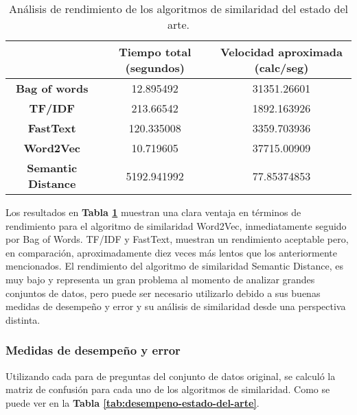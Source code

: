\begin{table}[]
	\centering
	\begin{tabular}{|c|c|c|}
		\hline
		& \textbf{Tiempo total (segundos)} & \textbf{Velocidad aproximada (calc/seg)} \\ \hline
		\textbf{Bag of words} & 12.895492 & 31351.26601 \\ \hline
		\textbf{TF/IDF} & 213.66542 & 1892.163926 \\ \hline
		\textbf{FastText} & 120.335008  & 3359.703936 \\ \hline
		\textbf{Word2Vec}  & 10.719605 & 37715.00909 \\ \hline
		\textbf{Semantic Distance} & 5192.941992 & 77.85374853 \\ \hline
	\end{tabular}
	\caption{Análisis de rendimiento de los algoritmos de similaridad del estado del arte.}
	\label{tab:performance-estado-del-arte}
\end{table}

Los resultados en \textbf{Tabla \ref{tab:performance-estado-del-arte}}  muestran una clara ventaja en términos de rendimiento para el algoritmo de similaridad Word2Vec, inmediatamente seguido por Bag of Words. TF/IDF y FastText, muestran un rendimiento aceptable pero, en comparación, aproximadamente diez veces más lentos que los anteriormente mencionados. El rendimiento del algoritmo de similaridad Semantic Distance, es muy bajo y representa un gran problema al momento de analizar grandes conjuntos de datos, pero puede ser necesario utilizarlo debido a sus buenas medidas de desempeño y error y su análisis de similaridad desde una perspectiva distinta.

\subsubsection{Medidas de desempeño y error}
Utilizando cada para de preguntas del conjunto de datos original, se calculó la matriz de confusión para cada uno de los algoritmos de similaridad. Como se puede ver en la \textbf{Tabla \ref{tab:desempeno-estado-del-arte}}.

